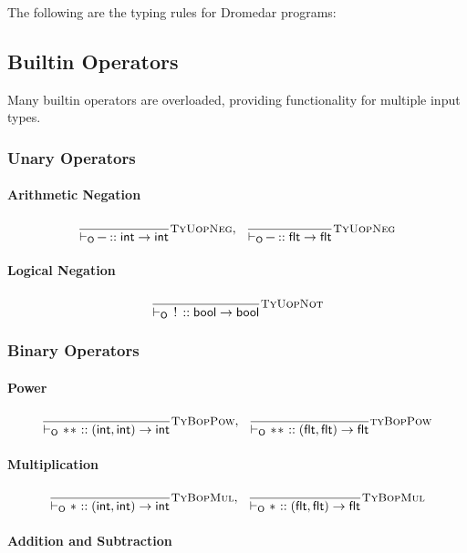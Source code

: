 \documentclass{article}
\newcommand{\code}[1]{\lstinline[columns=fixed]{#1}}
\newcommand{\drmrule}[5]{\frac{#1}{#2\vdash_{\mathsf{#3}}#4}\textsc{\small{#5}}}
\newcommand{\subsubsubsection}{\paragraph}
\begin{document}
		The following are the typing rules for Dromedar programs:
		
		\subsection{Builtin Operators}
		
			Many builtin operators are overloaded, providing functionality for multiple input types.
			
			\subsubsection{Unary Operators}
			
				\subsubsubsection{Arithmetic Negation}
				
					\begin{align*}
						\drmrule{}{}{O}{\textnormal{\code{-}} :: \mathsf{int \to int}}{TyUopNeg},\ \ 
						\drmrule{}{}{O}{\textnormal{\code{-}} :: \mathsf{flt \to flt}}{TyUopNeg}
					\end{align*}
				
				\subsubsubsection{Logical Negation}

					\begin{align*}
						\drmrule{}{}{O}{\textnormal{\code{!}} :: \mathsf{bool \to bool}}{TyUopNot}
					\end{align*}
			
			\subsubsection{Binary Operators}
			
				\subsubsubsection{Power}
				
					\begin{align*}
						\drmrule{}{}{O}{\textnormal{\code{**}} :: \mathsf{(int,int) \to int}}{TyBopPow},\ \ 
						\drmrule{}{}{O}{\textnormal{\code{**}} :: \mathsf{(flt,flt) \to flt}}{tyBopPow}
					\end{align*}
				
				\subsubsubsection{Multiplication}
				
					\begin{align*}
						\drmrule{}{}{O}{\textnormal{\code{*}} :: \mathsf{(int,int) \to int}}{TyBopMul},\ \ 
						\drmrule{}{}{O}{\textnormal{\code{*}} :: \mathsf{(flt,flt) \to flt}}{TyBopMul}
					\end{align*}
				
				\subsubsubsection{Addition and Subtraction}
				
\end{document}
